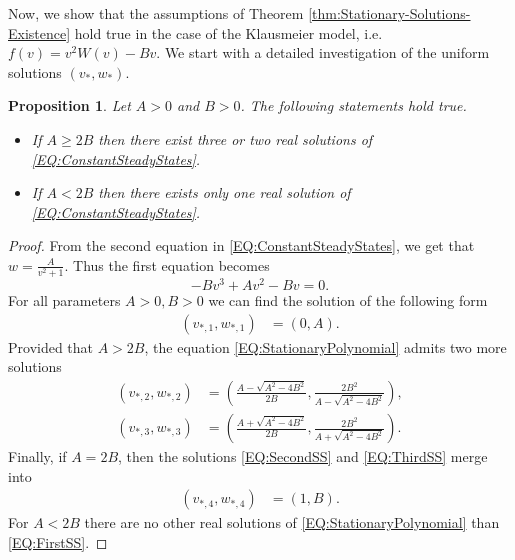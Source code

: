 \documentclass[11pt, a4paper]{article}
\theoremstyle{break}
\theoremstyle{break}
\newtheorem{prp}{Proposition}[section]
\theoremstyle{break}
\theoremstyle{break}
\theoremstyle{break}
\theoremstyle{break}
\theoremstyle{break}
\theoremstyle{break}
\theoremstyle{break}
\theoremstyle{break}
\begin{document}
Now, we show that the assumptions of Theorem \ref{thm:Stationary-Solutions-Existence} hold true in the case of the Klausmeier model, i.e.\ $f(v) = v^2W(v) - Bv$. We start with a detailed investigation of the uniform solutions $(v_*, w_*)$.

\begin{prp}
    \label{prp:ExistenceOfConstantSSKineticSystem}
    Let $A > 0$ and $B > 0$. The following statements hold true.
    \begin{itemize}
        \item If $A \geq 2B$ then there exist three or two real solutions of \eqref{EQ:ConstantSteadyStates}.
        \item If $A < 2B$ then there exists only one real solution of \eqref{EQ:ConstantSteadyStates}.
    \end{itemize}
\end{prp}

\begin{proof}
    From the second equation in \eqref{EQ:ConstantSteadyStates}, we get that $w = \frac{A}{v^2 + 1}$. Thus the first equation becomes
    \begin{equation}
        \label{EQ:StationaryPolynomial}
        -B v^3 + A v^2 - B v = 0.
    \end{equation}
    For all parameters $A > 0, B > 0$ we can find the solution of the following form
    \begin{align}
        \label{EQ:FirstSS}
        \left(v_{*,1}, w_{*,1}\right) &= \left(0, A\right).
    \end{align}
    Provided that $A > 2B$, the equation \eqref{EQ:StationaryPolynomial} admits two more solutions
    \begin{align}
        \left(v_{*,2}, w_{*,2}\right) &= \left(\frac{A - \sqrt{A^2 - 4B^2}}{2B}, \frac{2 B^2}{A - \sqrt{A^2 - 4B^2}}\right), \label{EQ:SecondSS}\\
        \left(v_{*,3}, w_{*,3}\right) &= \left(\frac{A + \sqrt{A^2 - 4B^2}}{2B}, \frac{2 B^2}{A + \sqrt{A^2 - 4B^2}}\right). \label{EQ:ThirdSS}
    \end{align}
    Finally, if $A = 2B$, then the solutions \eqref{EQ:SecondSS} and \eqref{EQ:ThirdSS} merge into 
    \begin{align}
        \label{EQ:FourthSS}
        \left( v_{*,4}, w_{*,4} \right) &= \left(1, B\right).
    \end{align}
    For $A < 2B$ there are no other real solutions of \eqref{EQ:StationaryPolynomial} than \eqref{EQ:FirstSS}.
\end{proof}
\end{document}
